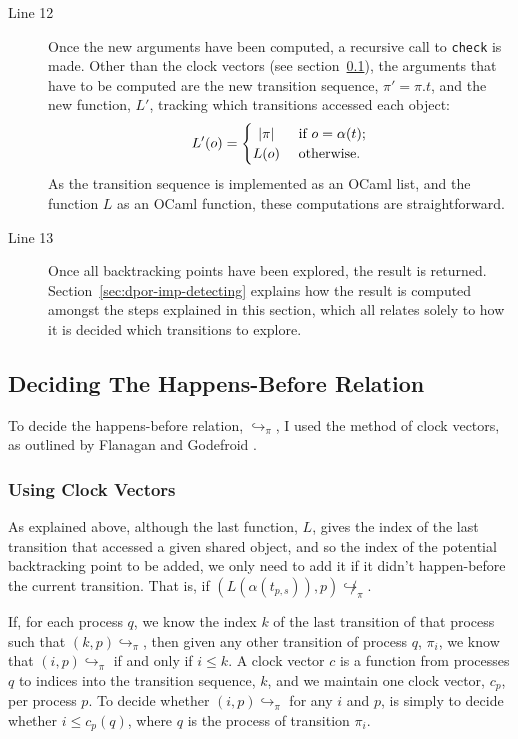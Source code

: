 \documentclass[12pt,a4paper,twoside,openright]{report}
\begin{document}
\begin{description}
	\item[Line 12] Once the new arguments have
	been computed, a recursive call to
	\texttt{check} is made. Other than
	the clock vectors (see section~\ref{sec:clock-vectors}),
	the arguments that
	have to be computed are the new transition
	sequence, $\pi' = \pi.t$,
	and the new function, $L'$,
	tracking which transitions accessed each 
	object:
	\[ L'(o) =
	\begin{cases}
		\hfill |\pi| \hfill & \text{ if } o = \alpha(t); \\
		\hfill L(o) \hfill & \text{ otherwise}.
	\end{cases}\]
	As the transition sequence is implemented as an
	OCaml list, and the function $L$ as an OCaml function,
	these computations are straightforward.

	\item[Line 13] Once all backtracking points have been
	explored, the result is returned.
	Section~\ref{sec:dpor-imp-detecting} explains how the
	result is computed amongst the steps explained in this
	section, which all relates solely to how it is
	decided which transitions to explore.

\end{description}

\subsection{Deciding The Happens-Before Relation}
\label{sec:clock-vectors}

To decide the happens-before relation,
$\hookrightarrow_\pi$, I used the method
of clock vectors, as outlined by Flanagan
and Godefroid \cite{flan05}.

\subsubsection{Using Clock Vectors}

As explained above, although
the last function, $L$, gives the index
of the last transition that accessed a given shared
object, and so the index of the potential backtracking
point to be added, we only need to add it if it
didn't happen-before the current transition.
That is, if
$(L(\alpha(t_{p,s})), p)\!\not\hookrightarrow_\pi$.


If, for each process
$q$, we know the index $k$ of the last transition of that
process such that $(k, p)\!\hookrightarrow_\pi$,
then given any other transition of
process $q$, $\pi_i$, we know that
$(i, p)\!\hookrightarrow_\pi$ if and only if
$i \leq k$. A clock vector $c$ is
a function from processes $q$ to
indices into the transition sequence, $k$,
and we maintain one clock vector, $c_p$, per
process $p$. To decide whether
$(i, p)\!\hookrightarrow_\pi$ for
any $i$ and $p$, is simply to decide
whether $i \leq c_p(q)$, where $q$ is
the process of transition $\pi_i$.
\end{document}
